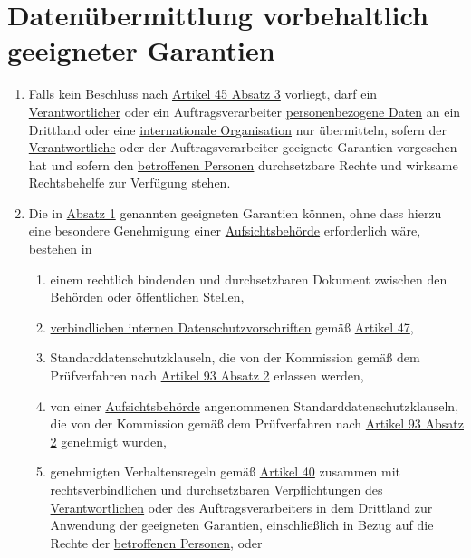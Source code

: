 \chapter{Datenübermittlung vorbehaltlich geeigneter Garantien}
\label{ch:46}


\begin{enumerate}

  \item Falls kein Beschluss nach \hyperref[itm:45-3]{Artikel 45 Absatz 3} vorliegt, darf ein \hyperref[itm:04-7]{Verantwortlicher} oder ein
   Auftragsverarbeiter \hyperref[itm:04-1]{personenbezogene Daten} an ein Drittland oder eine \hyperref[itm:04-29]{internationale Organisation} nur übermitteln,
   sofern der \hyperref[itm:04-7]{Verantwortliche} oder der Auftragsverarbeiter geeignete Garantien vorgesehen hat und sofern den
   \hyperref[itm:04-1]{betroffenen Personen} durchsetzbare Rechte und wirksame Rechtsbehelfe zur Verfügung stehen.
  \label{itm:46-1}

  \item Die in \hyperref[itm:46-1]{Absatz 1} genannten geeigneten Garantien können, ohne dass hierzu eine besondere
   Genehmigung einer \hyperref[itm:04-21]{Aufsichtsbehörde} erforderlich wäre, bestehen in
  \label{itm:46-2}

  \begin{enumerate}
  
    \item einem rechtlich bindenden und durchsetzbaren Dokument zwischen den Behörden oder öffentlichen Stellen,
    \label{itm:46-2a}

    \item \hyperref[itm:04-20]{verbindlichen internen Datenschutzvorschriften} gemäß \hyperref[ch:47]{Artikel 47},
    \label{itm:46-2b}

    \item Standarddatenschutzklauseln, die von der Kommission gemäß dem Prüfverfahren nach \hyperref[itm:93-2]
     {Artikel 93 Absatz 2} erlassen werden,
    \label{itm:46-2c}

    \item von einer \hyperref[itm:04-21]{Aufsichtsbehörde} angenommenen Standarddatenschutzklauseln, die von der Kommission gemäß dem
     Prüfverfahren nach \hyperref[itm:93-2]{Artikel 93 Absatz 2} genehmigt wurden,
    \label{itm:46-2d}

    \item genehmigten Verhaltensregeln gemäß \hyperref[ch:40]{Artikel 40} zusammen mit rechtsverbindlichen und
     durchsetzbaren Verpflichtungen des \hyperref[itm:04-7]{Verantwortlichen} oder des Auftragsverarbeiters in dem Drittland zur Anwendung
     der geeigneten Garantien, einschließlich in Bezug auf die Rechte der \hyperref[itm:04-1]{betroffenen Personen}, oder
    \label{itm:46-2e}


\end{enumerate}
\end{enumerate}
